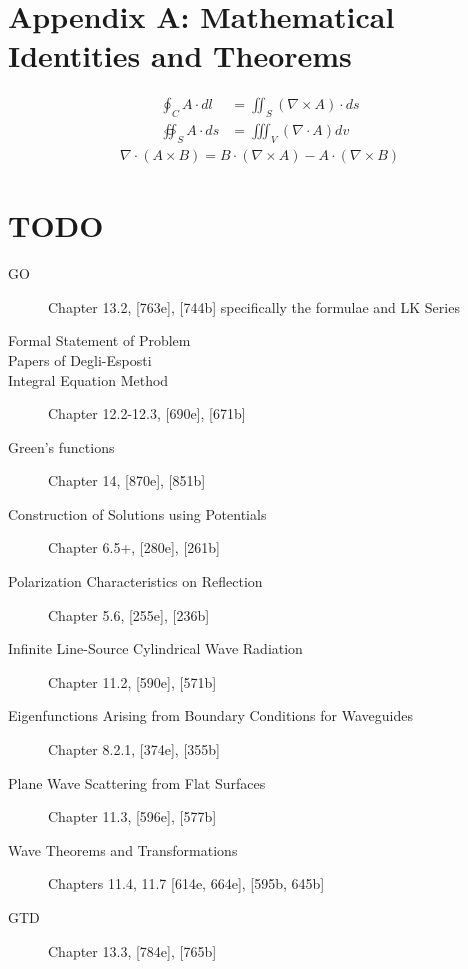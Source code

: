 \documentclass{article}
\numberwithin{equation}{section}
\begin{document}
\section*{Appendix A: Mathematical Identities and Theorems}
\begin{subequations} \label{eq:integralVectorTheorems}
    \begin{align}
        \oint_C A \cdot dl &= \iint_S (\nabla \times A) \cdot ds \label{eq:stokes} \\
        \oiint_S A \cdot ds &= \iiint_V (\nabla \cdot A) dv \label{eq:divergence}
    \end{align}
\end{subequations}
\begin{subequations} \label{eq:vectorDifferentialIdentities}
    \begin{align}
        \nabla \cdot (A \times B) = B \cdot (\nabla \times A) - A \cdot (\nabla \times B) \label{eq:divOfCurlOfProduct}
    \end{align}
\end{subequations}
\section*{TODO}
\begin{description}
    \item[GO] Chapter 13.2, [763e], [744b] specifically the formulae and LK Series
    \item[Formal Statement of Problem]
    \item[Papers of Degli-Esposti]
    \item[Integral Equation Method] Chapter 12.2-12.3, [690e], [671b]
    \item[Green's functions] Chapter 14, [870e], [851b]
    \item[Construction of Solutions using Potentials] Chapter 6.5+, [280e], [261b] 
    \item[Polarization Characteristics on Reflection] Chapter 5.6, [255e], [236b] 
    \item[Infinite Line-Source Cylindrical Wave Radiation] Chapter 11.2, [590e], [571b] 
    \item[Eigenfunctions Arising from Boundary Conditions for Waveguides] Chapter 8.2.1, [374e], [355b] 
    \item[Plane Wave Scattering from Flat Surfaces] Chapter 11.3, [596e], [577b] 
    \item[Wave Theorems and Transformations] Chapters 11.4, 11.7 [614e, 664e], [595b, 645b] 
    \item[GTD] Chapter 13.3, [784e], [765b]

\end{description}
\end{document}
